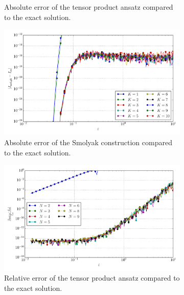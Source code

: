 \documentclass[a4paper,10pt]{article}
\begin{document}
\begin{figure}[ht!]
\begin{subfigure}[t]{0.5\linewidth}
    \caption{Absolute error of the tensor product ansatz compared to the exact solution.}
    \label{fig:tp_sg_3d_conv_eps_400_040_err_nsd_tp}
  \end{subfigure}
  \begin{subfigure}[t]{0.5\linewidth}
    \includegraphics[width=\linewidth]{./plots/tp_sg_3d_conv_eps_(4,0,0)_(0,4,0)_err_nsd_gk.pdf}
    \caption{Absolute error of the Smolyak construction compared to the exact solution.}
    \label{fig:tp_sg_3d_conv_eps_400_040_err_nsd_gk}
  \end{subfigure}
  \begin{subfigure}[t]{0.5\linewidth}
    \includegraphics[width=\linewidth]{./plots/tp_sg_3d_conv_eps_(4,0,0)_(0,4,0)_err_rel_nsd_tp.pdf}
    \caption{Relative error of the tensor product ansatz compared to the exact solution.}
    \label{fig:tp_sg_3d_conv_eps_400_040_err_rel_nsd_tp}
  \end{subfigure}
  \begin{subfigure}[t]{0.5\linewidth}

\end{subfigure}
\end{figure}
\end{document}
